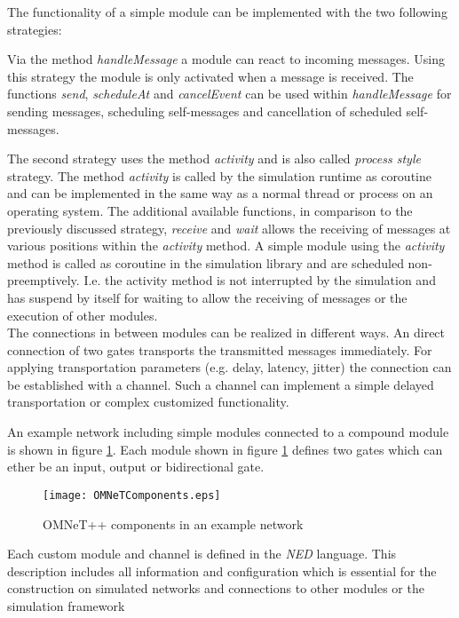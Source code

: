 The functionality of a simple module can be implemented with the two following strategies:

Via the method \emph{handleMessage} a module can react to incoming messages.
Using this strategy the module is only activated when a message is received.
The functions \emph{send}, \emph{scheduleAt} and \emph{cancelEvent} can be used within \emph{handleMessage} for sending messages, scheduling self-messages and cancellation of scheduled self-messages. \cite[section 4.4.1]{omnet_manual}

The second strategy uses the method \emph{activity} and is also called \emph{process style} strategy.
The method \emph{activity} is called by the simulation runtime as coroutine and can be implemented in the same way as a normal thread or process on an operating system.
The additional available functions, in comparison to the previously discussed strategy, \emph{receive} and \emph{wait} allows the receiving of messages at various positions within the \emph{activity} method.
A simple module using the \emph{activity} method is called as coroutine in the simulation library and are scheduled non-preemptively.
I.e. the activity method is not interrupted by the simulation and has suspend by itself for waiting to allow the receiving of messages or the execution of other modules.
\\

The connections in between modules can be realized in different ways.
An direct connection of two gates transports the transmitted messages immediately.
For applying transportation parameters (e.g. delay, latency, jitter) the connection can be established with a channel.
Such a channel can implement a simple delayed transportation or complex customized functionality.

An example network including simple modules connected to a compound module is shown in figure \ref{fig:OMNeTComponents}.
Each module shown in figure \ref{fig:OMNeTComponents} defines two gates which can ether be an input, output or bidirectional gate.

\begin{figure}
    \centering
    \texttt{[image: OMNeTComponents.eps]}
    \caption{OMNeT++ components in an example network}
    \label{fig:OMNeTComponents}
\end{figure}

Each custom module and channel is defined in the \emph{NED} language.
This description includes all information and configuration which is essential for the construction on simulated networks and connections to other modules or the simulation framework


